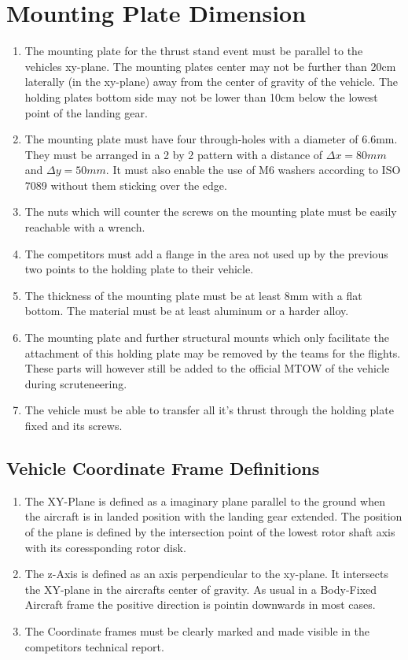 \documentclass{article}
\begin{document}
\section{Mounting Plate Dimension}
\begin{enumerate}
  \item The mounting plate for the thrust stand event must be parallel to the vehicles xy-plane. The mounting plates center may not be further than 20cm laterally (in the xy-plane) away from the center of gravity of the vehicle. The holding plates bottom side may not be lower than 10cm below the lowest point of the landing gear. 
  \item The mounting plate must have four through-holes with a diameter of 6.6mm. They must be arranged in a 2 by 2 pattern with a distance of ${\Delta}x=80mm$ and ${\Delta}y=50mm$. It must also enable the use of M6 washers according to ISO 7089 without them sticking over the edge.
  \item The nuts which will counter the screws on the mounting plate must be easily reachable with a wrench.  
  \item The competitors must add a flange in the area not used up by the previous two points to the holding plate to their vehicle. 
  \item The thickness of the mounting plate must be at least 8mm with a flat bottom. The material must be at least aluminum or a harder alloy.
  \item The mounting plate and further structural mounts which only facilitate the attachment of this holding plate may be removed by the teams for the flights. These parts will however still be added to the official MTOW of the vehicle during scruteneering.
  \item The vehicle must be able to transfer all it's thrust through the holding plate fixed and its screws. 
\end{enumerate}

\subsection{Vehicle Coordinate Frame Definitions}
\begin{enumerate}
  \item The XY-Plane is defined as a imaginary plane parallel to the ground when the aircraft is in landed position with the landing gear extended. The position of the plane is defined by the intersection point of the lowest rotor shaft axis with its coressponding rotor disk.
  \item The z-Axis is defined as an axis perpendicular to the xy-plane. It intersects the XY-plane in the aircrafts center of gravity. As usual in a Body-Fixed Aircraft frame the positive direction is pointin downwards in most cases.
  \item The Coordinate frames must be clearly marked and made visible in the competitors technical report. 
\end{enumerate}
\end{document}
